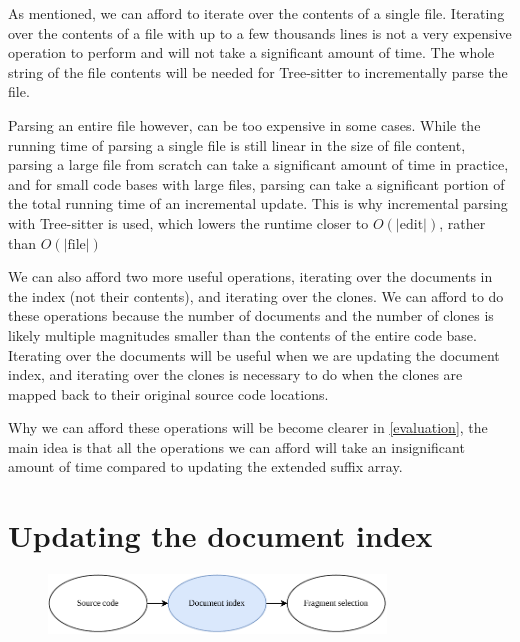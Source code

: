 As mentioned, we can afford to iterate over the contents of a single file. Iterating over
the contents of a file with up to a few thousands lines is not a very expensive operation
to perform and will not take a significant amount of time. The whole string of the file
contents will be needed for Tree-sitter to incrementally parse the file.

Parsing an entire file however, can be too expensive in some cases. While the running time
of parsing a single file is still linear in the size of file content, parsing a large file
from scratch can take a significant amount of time in practice, and for small code bases
with large files, parsing can take a significant portion of the total running time of an
incremental update. This is why incremental parsing with Tree-sitter is used, which lowers
the runtime closer to $O(\vert\text{edit}\vert)$, rather than $O(\vert \text{file} \vert)$

We can also afford two more useful operations, iterating over the documents in the index
(not their contents), and iterating over the clones. We can afford to do these operations
because the number of documents and the number of clones is likely multiple magnitudes
smaller than the contents of the entire code base. Iterating over the documents will be
useful when we are updating the document index, and iterating over the clones is necessary
to do when the clones are mapped back to their original source code locations.

Why we can afford these operations will be become clearer in \cref{evaluation}, the main
idea is that all the operations we can afford will take an insignificant amount of time
compared to updating the extended suffix array.

\section{Updating the document index}

\begin{figure}[H]
    \begin{center}
        \includegraphics[width=0.8\textwidth]{figures/phases/phases_documentindex.drawio.pdf}
    \end{center}
\end{figure}

